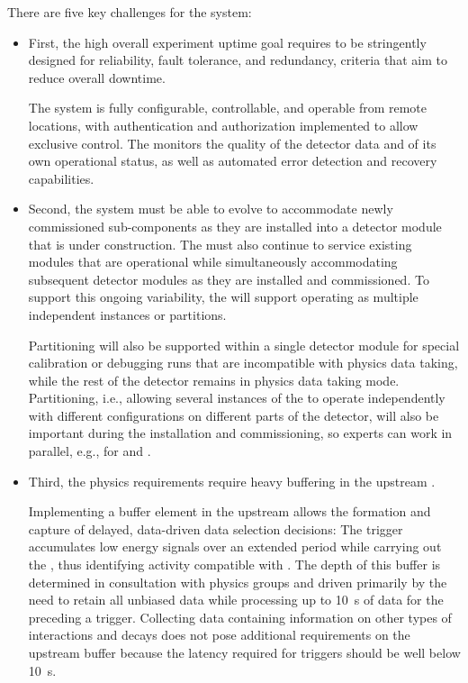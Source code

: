 There are five key challenges for the    system: 
\begin{itemize}
\item First, the high overall experiment uptime goal requires  to be stringently designed for reliability, fault tolerance, and redundancy, criteria that aim to reduce overall downtime.

  The  system is fully configurable, controllable, and operable from remote locations, with authentication and authorization implemented to allow exclusive control. The  monitors the quality of the detector data and of its own operational status, as well as automated error detection and recovery capabilities.

\item Second, the system must be able to evolve to accommodate newly commissioned sub-components as they are installed into a detector module that is under construction. 
  The  must also continue to service existing modules that are operational while simultaneously accommodating subsequent detector modules as they are installed and commissioned. 
  To support this ongoing variability, the  will support operating as multiple independent instances or partitions.

  Partitioning will also be supported  within a single detector module for special calibration or debugging runs that are incompatible with physics data taking, while the rest of the detector remains in physics data taking mode. Partitioning, i.e., allowing several instances of the  to operate independently with different configurations on different parts of the detector, will also be important during the installation and commissioning, so experts can work in parallel, e.g., for  and .

\item Third, the  physics requirements require heavy buffering in the upstream . 

  Implementing a buffer element in the upstream  allows
  the formation and capture of delayed, data-driven data selection
  decisions:
  The trigger accumulates low energy signals over an extended period
  while carrying out the , thus identifying activity compatible with .
  The depth of this buffer is determined in
  consultation with physics groups and driven primarily by the need
  to retain all unbiased data while processing up to \SI{10}{s} of
  data for the  preceding a  trigger.
  Collecting data containing information on other types of interactions and decays does not pose additional requirements on the upstream  buffer because the latency required for triggers should be well below \SI{10}{s}.


\end{itemize}
